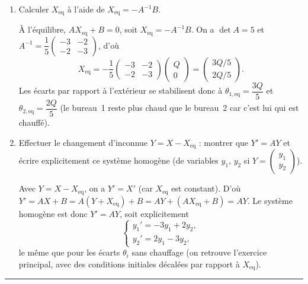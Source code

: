 \begin{enumerate}[itemsep=2em]
\begin{enumerate}[label=\alph*), itemsep=0.6em]
  \item Calculer $X_{\mathrm{eq}}$ à l'aide de $X_{\mathrm{eq}} = -A^{-1}B$.

\begin{solution}
À l'équilibre, $AX_{\mathrm{eq}} + B = 0$, soit $X_{\mathrm{eq}} = -A^{-1}B$.
On a $\det A = 5$ et
$A^{-1} = \dfrac{1}{5}\begin{pmatrix} -3 & -2 \\ -2 & -3 \end{pmatrix}$, d'où
\[
  X_{\mathrm{eq}}
  = -\frac{1}{5}\begin{pmatrix} -3 & -2 \\ -2 & -3 \end{pmatrix}
    \begin{pmatrix} Q \\ 0 \end{pmatrix}
  = \begin{pmatrix} 3Q/5 \\ 2Q/5 \end{pmatrix}.
\]
Les écarts par rapport à l'extérieur se stabilisent donc à $\theta_{1,\mathrm{eq}} = \dfrac{3Q}{5}$ et $\theta_{2,\mathrm{eq}} = \dfrac{2Q}{5}$ (le bureau~1 reste plus chaud que le bureau~2 car c'est lui qui est chauffé).
\end{solution}

  \item Effectuer le changement d'inconnue $Y = X - X_{\mathrm{eq}}$ : montrer que $Y' = AY$ et écrire explicitement ce système homogène (de variables $y_1$, $y_2$ si $Y = \begin{pmatrix} y_1 \\ y_2 \end{pmatrix}$).

\begin{solution}
Avec $Y = X - X_{\mathrm{eq}}$, on a $Y' = X'$ (car $X_{\mathrm{eq}}$ est constant). D'où
$Y' = AX + B = A(Y + X_{\mathrm{eq}}) + B = AY + (AX_{\mathrm{eq}} + B) = AY$.
Le système homogène est donc $Y' = AY$, soit explicitement
\[
\begin{cases}
  y_1' = -3y_1 + 2y_2, \\[0.2em]
  y_2' = 2y_1 - 3y_2,
\end{cases}
\]
le même que pour les écarts $\theta_i$ sans chauffage (on retrouve l'exercice principal, avec des conditions initiales décalées par rapport à $X_{\mathrm{eq}}$).
\end{solution}
\end{enumerate}

\vspace{1.5em}
\hrule
\vspace{1em}


\end{enumerate}
